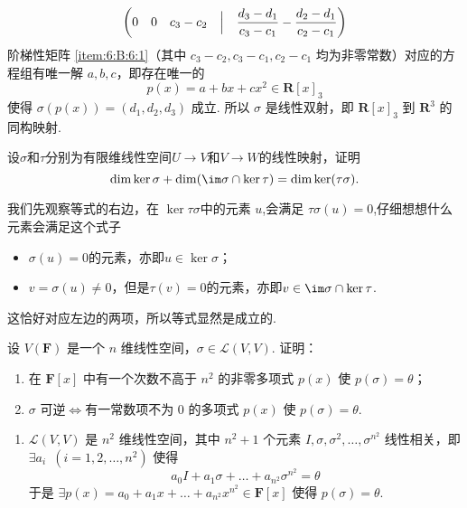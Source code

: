 \begin{exercise}
\begin{exgroup}
\begin{answer}
\begin{align}
\begin{pmatrix}
                                   0 & 0   & c_3 - c_2 & \Bigm| & \dfrac{d_3 - d_1}{c_3 - c_1} - \dfrac{d_2 - d_1}{c_2 - c_1}
                               \end{pmatrix} \label{item:6:B:6:1}
          \end{align}
          阶梯性矩阵 \ref*{item:6:B:6:1}（其中 $ c_3 - c_2, c_3 - c_1, c_2 - c_1 $ 均为非零常数）对应的方程组有唯一解 $ a, b, c $，即存在唯一的
          \[ p(x) = a + bx + cx^2 \in \mathbf{R}[x]_3 \]
          使得 $ \sigma(p(x)) = (d_1, d_2, d_3) $ 成立. 所以 $ \sigma $ 是线性双射，即 $ \mathbf{R}[x]_3 $ 到 $ \mathbf{R}^3 $ 的同构映射.
        \end{answer}

        \item 设$\sigma$和$\tau$分别为有限维线性空间$U\to V$和$V\to W$的线性映射，证明
        \[\dim\ker\sigma+\dim(\im\sigma\cap\ker\tau)=\dim\ker(\tau\sigma).\]

        \begin{answer}
            我们先观察等式的右边，在 $\ker \tau \sigma$中的元素 $u$,会满足 $\tau \sigma (u) = 0 $,仔细想想什么元素会满足这个式子
            \begin{itemize}
                \item $\sigma(u)=0$的元素，亦即$u\in \ker \sigma$；
                \item $v=\sigma(u)\neq 0$，但是$\tau(v)=0$的元素，亦即$v\in \im \sigma \cap \ker \tau$.
            \end{itemize}
            这恰好对应左边的两项，所以等式显然是成立的.
        \end{answer}
    \end{exgroup}

    \begin{exgroup}
        \item 设 $V(\mathbf{F})$ 是一个 $n$ 维线性空间，$\sigma \in \mathcal{L}(V,V)$. 证明：
        \begin{enumerate}
            \item 在 $\mathbf{F}[x]$ 中有一个次数不高于 $n^2$ 的非零多项式 $p(x)$ 使 $p(\sigma) = \theta$；

            \item $\sigma$ 可逆$\iff$有一常数项不为 0 的多项式 $p(x)$ 使 $p(\sigma) = \theta$.
        \end{enumerate}
        \begin{answer}
            \begin{enumerate}
                \item \label{item:5:C:1:1}
                      $ \mathcal{L}(V, V) $ 是 $ n^2 $ 维线性空间，其中 $ n^2 + 1 $ 个元素 $ I, \sigma, \sigma^2, \ldots, \sigma^{n^2} $ 线性相关，即 $ \exists a_i\enspace (i = 1, 2, \ldots, n^2) $ 使得
                      \[ a_0 I + a_1 \sigma + \ldots + a_{n^2} \sigma^{n^2} = \theta \]
                      于是 $ \exists p(x) = a_0 + a_1 x + \ldots + a_{n^2} x^{n^2} \in \mathbf{F}[x] $ 使得 $ p(\sigma) = \theta $.


\end{enumerate}
\end{answer}
\end{exgroup}
\end{exercise}
